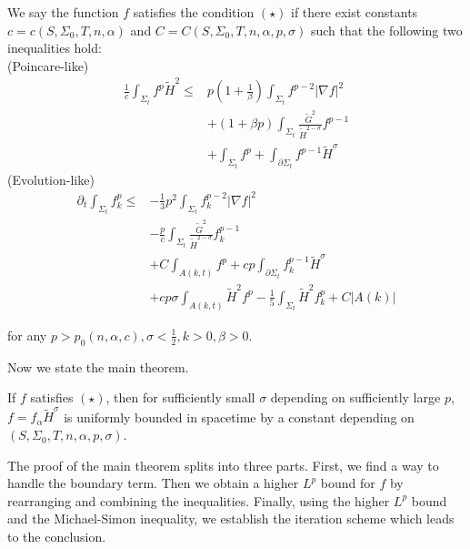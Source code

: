 We say the function $f$ satisfies the condition $(\star)$ if there exist constants $c=c(S, \Sigma_0,T,n,\alpha )$ and $C=C(S,\Sigma _0,T,n,\alpha ,p,\sigma )$ such that the following two inequalities hold:\\
(Poincare-like)
\begin{equation} \label{PLE}
\begin{split}
    \frac{1}{c}\int_{\Sigma_t} f^p \tilde{H}^2 
\leq &  p \left( 1+\frac{1}{\beta } \right) \int_{\Sigma_t} f^{p-2}\left| \nabla f \right| ^2  \\
&+\left( 1+\beta p \right) \int_{\Sigma_t} \frac{\tilde{G}^2}{\tilde{H}^{2-\sigma }}f^{p-1}\\
&+\int_{\Sigma_t} f^p+\int_{\partial \Sigma_t} f^{p-1}\tilde{H}^{\sigma }
\end{split}
\end{equation}
(Evolution-like)
\begin{equation} \label{ELE}
    \begin{split}
        \partial_t \int_{\Sigma_t} f_k^p
    \leq &  -\frac{1}{3}p^2 \int_{\Sigma_t} f_{k}^{p-2}\left| \nabla f \right| ^2  \\
    &-\frac{p}{c} \int_{\Sigma_t} \frac{\tilde{G}^2}{\tilde{H}^{2-\sigma }}f_{k}^{p-1}\\
    &+C \int_{A(k,t)} f^p+cp\int_{\partial \Sigma_t} f_{k}^{p-1}\tilde{H}^{\sigma }\\
    &+cp \sigma \int_{A(k,t)}^{}\tilde{H}^2f^p-\frac{1}{5}\int_{\Sigma_t} \tilde{H}^2f_{k}^{p}+C \left| A(k) \right| 
    \end{split}
    \end{equation}

for any $p>p_0(n,\alpha ,c), \sigma <\frac{1}{2}, k>0, \beta >0$. 

Now we state the main theorem.

\begin{theorem}
    If $f$ satisfies $(\star)$, then for sufficiently small $\sigma $ depending on sufficiently large $p$, $f=f_{\alpha }\tilde{H}^{\sigma }$ is uniformly bounded in spacetime by a constant depending on $(S,\Sigma _0,T,n,\alpha ,p,\sigma )$. 
\end{theorem}

The proof of the main theorem splits into three parts. First, we find a way to handle the boundary term. Then we obtain a higher $L^p$ bound for $f$ by rearranging and combining the inequalities. Finally, using the higher $L^p$ bound and the Michael-Simon inequality, we establish the iteration scheme which leads to the conclusion.

